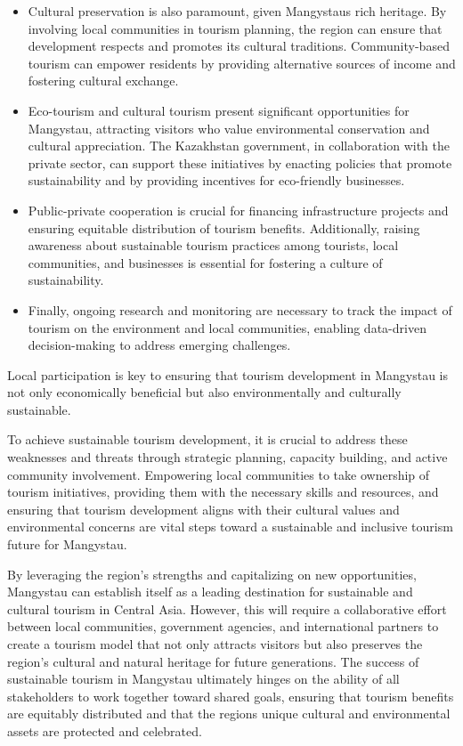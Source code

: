 \begin{multicols}{2}
\begin{itemize}
\item
  Cultural preservation is also paramount, given
  Mangystau\textquotesingle s rich heritage. By involving local
  communities in tourism planning, the region can ensure that
  development respects and promotes its cultural traditions.
  Community-based tourism can empower residents by providing alternative
  sources of income and fostering cultural exchange.
\item
  Eco-tourism and cultural tourism present significant opportunities for
  Mangystau, attracting visitors who value environmental conservation
  and cultural appreciation. The Kazakhstan government, in collaboration
  with the private sector, can support these initiatives by enacting
  policies that promote sustainability and by providing incentives for
  eco-friendly businesses.
\item
  Public-private cooperation is crucial for financing infrastructure
  projects and ensuring equitable distribution of tourism benefits.
  Additionally, raising awareness about sustainable tourism practices
  among tourists, local communities, and businesses is essential for
  fostering a culture of sustainability.
\item
  Finally, ongoing research and monitoring are necessary to track the
  impact of tourism on the environment and local communities, enabling
  data-driven decision-making to address emerging challenges.
\end{itemize}

Local participation is key to ensuring that tourism development in
Mangystau is not only economically beneficial but also environmentally
and culturally sustainable.

To achieve sustainable tourism development, it is crucial to address
these weaknesses and threats through strategic planning, capacity
building, and active community involvement. Empowering local communities
to take ownership of tourism initiatives, providing them with the
necessary skills and resources, and ensuring that tourism development
aligns with their cultural values and environmental concerns are vital
steps toward a sustainable and inclusive tourism future for Mangystau.

By leveraging the region's strengths and capitalizing on new
opportunities, Mangystau can establish itself as a leading destination
for sustainable and cultural tourism in Central Asia. However, this will
require a collaborative effort between local communities, government
agencies, and international partners to create a tourism model that not
only attracts visitors but also preserves the region's cultural and
natural heritage for future generations. The success of sustainable
tourism in Mangystau ultimately hinges on the ability of all
stakeholders to work together toward shared goals, ensuring that tourism
benefits are equitably distributed and that the region\textquotesingle s
unique cultural and environmental assets are protected and celebrated.


\end{multicols}
